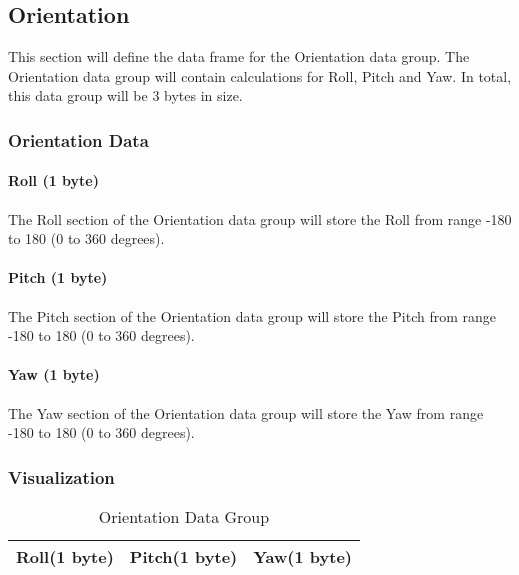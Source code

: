 \documentclass{article}
\begin{document}
  \subsection{Orientation}
  This section will define the data frame for the Orientation data group. The Orientation data group will contain calculations for Roll, Pitch and Yaw. In total, this data group will be 3 bytes in size.
  \subsubsection{Orientation Data}
  \paragraph{Roll (1 byte)}
  The Roll section of the Orientation data group will store the Roll from range -180 to 180 (0 to 360 degrees).
  \paragraph{Pitch (1 byte)}
  The Pitch section of the Orientation data group will store the Pitch from range -180 to 180 (0 to 360 degrees).  
  \paragraph{Yaw (1 byte)}
  The Yaw section of the Orientation data group will store the Yaw from range -180 to 180 (0 to 360 degrees).  
  
  \subsubsection{Visualization}
  \begin{table}[H]
  \centering
  \caption{Orientation Data Group}
  \label{Orientation}
  \begin{tabular}{|l|l|l|}
  \hline
Roll(1 byte) & Pitch(1 byte) & Yaw(1 byte) \\ \hline
  \end{tabular}
  \end{table}
  
  
\end{document}
